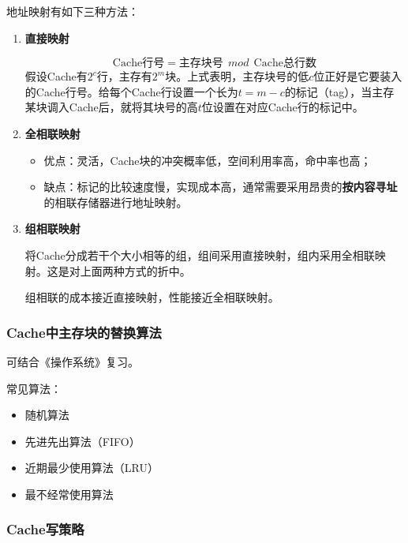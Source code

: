 \documentclass[12pt, a4paper, oneside]{ctexart}
\begin{document}
地址映射有如下三种方法：
\begin{enumerate}
  \item {\bf 直接映射}
  
  \begin{equation*}
    \text{Cache行号}=\text{主存块号}\ \  mod\ \  \text{Cache总行数}
  \end{equation*}
  假设Cache有$2^c$行，主存有$2^m$块。上式表明，主存块号的低$c$位正好是它要装入的Cache行号。给每个Cache行设置一个长为$t=m-c$的标记（tag），当主存某块调入Cache后，就将其块号的高$t$位设置在对应Cache行的标记中。
  \item {\bf 全相联映射}
  
  \begin{itemize}
    \item 优点：灵活，Cache块的冲突概率低，空间利用率高，命中率也高；
    \item 缺点：标记的比较速度慢，实现成本高，通常需要采用昂贵的\textbf{按内容寻址}的相联存储器进行地址映射。
  \end{itemize}
  \item {\bf 组相联映射}
  
  将Cache分成若干个大小相等的组，组间采用直接映射，组内采用全相联映射。这是对上面两种方式的折中。

  组相联的成本接近直接映射，性能接近全相联映射。
\end{enumerate}

\subsubsection{Cache中主存块的替换算法}

可结合《操作系统》复习。

常见算法：
\begin{itemize}
  \item 随机算法
  \item 先进先出算法（FIFO）
  \item 近期最少使用算法（LRU）
  \item 最不经常使用算法
\end{itemize}

\subsubsection{Cache写策略}
\end{document}
